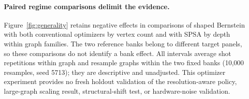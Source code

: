 {\paragraph{Paired regime comparisons delimit the evidence.}
Figure~\ref{fig:generality} retains negative effects in comparisons of shaped Bernstein with both conventional optimizers by vertex count and with SPSA by depth within graph families. The two reference banks belong to different target panels, so these comparisons do not identify a bank effect. All intervals average shot repetitions within graph and resample graphs within the two fixed banks (10,000 resamples, seed 5713); they are descriptive and unadjusted. This optimizer experiment provides no fresh holdout validation of the resolution-aware policy, large-graph scaling result, structural-shift test, or hardware-noise validation.
}
\newcommand{\RadiusResults}{%
\paragraph{Unresolved stopping often precedes increased model allocation.}
In the matched shape-by-rule experiment, 31/256 runs fit a model away from the initial radius (32/288 fits), and 28/256 runs allocate more than 256 shots per point (28/288 fits). Every resolution-aware Hoeffding run fits one initial model and completes one full four-look endpoint comparison before stopping with an unresolved decision. Its costs are therefore exactly $5(256)+2(16384)=34048$ at depth two and $7(256)+2(16384)=34560$ at depth three. The savings on these Hoeffding trajectories come from avoiding continuation; they do not demonstrate an improvement from changing the model-shot allocation.
}
